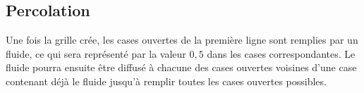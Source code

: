 \documentclass[t,10pt]{article}
\begin{document}
%
%
%
%
%
%
%
%
%
%

%
\subsection*{Percolation}\label{percolation}
%




Une fois la grille crée, les cases ouvertes de la première ligne sont
remplies par un fluide, ce qui sera représenté par la valeur $0,5$ dans
les cases correspondantes. Le fluide pourra ensuite être diffusé à
chacune des cases ouvertes voisines d'une case contenant déjà le fluide jusqu'à remplir toutes les cases ouvertes possibles.
\end{document}
